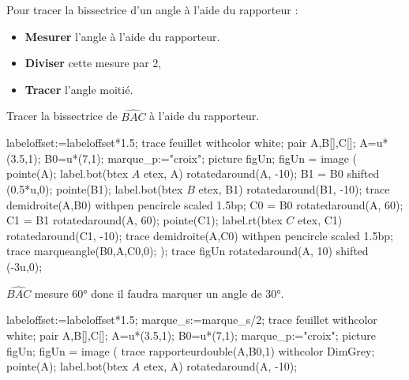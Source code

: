 \begin{changemargin}{0mm}{-15mm}
    \begin{methode}
        Pour tracer la bissectrice d'un angle à l'aide du rapporteur :
        \begin{itemize}
            \item {\bfseries Mesurer} l'angle à l'aide du rapporteur.
            \item {\bfseries Diviser} cette mesure par 2,
            \item {\bfseries Tracer} l'angle moitié.
        \end{itemize}
        \exercice
        Tracer la bissectrice de $\widehat{BAC}$ à l'aide du rapporteur. \par\vspace*{5mm}
        \begin{Geometrie}[CoinHD={(6.5u,5u)}]
            labeloffset:=labeloffset*1.5;
            trace feuillet withcolor white;
            pair A,B[],C[];
            A=u*(3.5,1);
            B0=u*(7,1);
            marque_p:="croix";
            picture figUn;
            figUn = image (
                pointe(A);
                label.bot(btex $A$ etex, A) rotatedaround(A, -10);
                B1 = B0 shifted (0.5*u,0);
                pointe(B1);
                label.bot(btex $B$ etex, B1)  rotatedaround(B1, -10);
                trace demidroite(A,B0) withpen pencircle scaled 1.5bp;
                C0 = B0 rotatedaround(A, 60);
                C1 = B1 rotatedaround(A, 60);
                pointe(C1);
                label.rt(btex $C$ etex, C1)  rotatedaround(C1, -10);            
                trace demidroite(A,C0) withpen pencircle scaled 1.5bp;
                trace marqueangle(B0,A,C0,0);
            );
            trace figUn rotatedaround(A, 10) shifted (-3u,0);
        \end{Geometrie}
        \correction
        $\widehat{BAC}$ mesure \ang{60} donc il faudra marquer un angle de \ang{30}. \par\vspace*{5mm}
        \begin{Geometrie}[CoinHD={(8.5u,5u)}]
            labeloffset:=labeloffset*1.5;
            marque_s:=marque_s/2;
            trace feuillet withcolor white;
            pair A,B[],C[];
            A=u*(3.5,1);
            B0=u*(7,1);
            marque_p:="croix";
            picture figUn;
            figUn = image (
                trace rapporteurdouble(A,B0,1) withcolor DimGrey;
                pointe(A);
                label.bot(btex $A$ etex, A) rotatedaround(A, -10);

\end{Geometrie}
\end{methode}
\end{changemargin}
